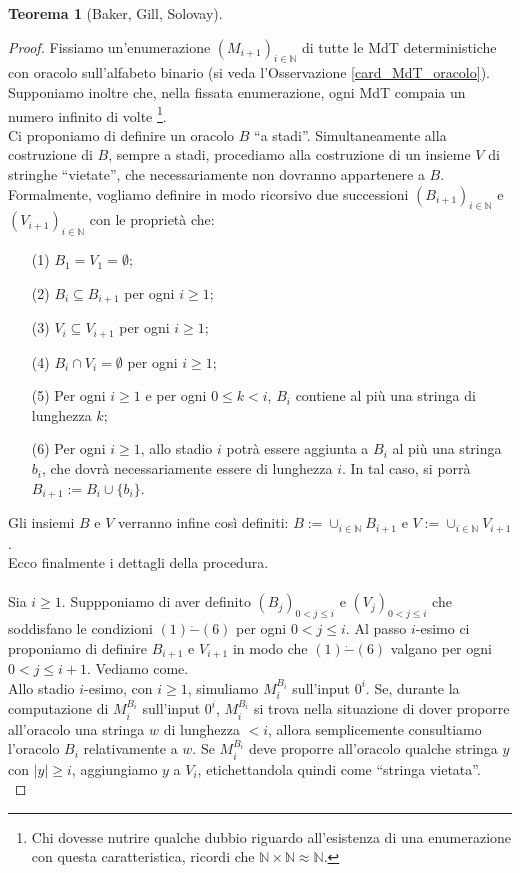 \documentclass[12pt,a4paper]{report}
\theoremstyle{definition}
\newtheorem{teo}{Teorema}[section]  %
\begin{document}
\begin{teo}[Baker, Gill, Solovay]
\begin{proof}
Fissiamo un'enumerazione $(M_{i+1})_{i \in \mathbb{N}}$ di tutte le MdT deterministiche con oracolo sull'alfabeto binario (si veda l'Osservazione \ref{card_MdT_oracolo}). Supponiamo inoltre che, nella fissata enumerazione, ogni MdT compaia un numero infinito di volte \footnote{Chi dovesse nutrire qualche dubbio riguardo all'esistenza di una enumerazione con questa caratteristica, ricordi che $\mathbb{N} \times \mathbb{N} \approx \mathbb{N}$.}.\\
Ci proponiamo di definire un oracolo $B$ ``a stadi''. Simultaneamente alla costruzione di $B$, sempre a stadi, procediamo alla costruzione di un insieme $V$ di stringhe ``vietate'', che necessariamente non dovranno appartenere a $B$.\\
Formalmente, vogliamo definire in modo ricorsivo due successioni $(B_{i+1})_{i \in \mathbb{N}}$ e $(V_{i+1})_{i \in \mathbb{N}}$ con le proprietà che:
\begin{enumerate}
\item[(1)] $B_1=V_1=\emptyset$;
\item[(2)] $B_i \subseteq B_{i+1}$ per ogni $i \geq 1$;
\item[(3)] $V_i \subseteq V_{i+1}$ per ogni $i \geq 1$;
\item[(4)] $B_i \cap V_i = \emptyset$ per ogni $i \geq 1$;
\item[(5)] Per ogni $i \geq 1$ e per ogni $0 \leq k < i$, $B_i$ contiene al più una stringa di lunghezza $k$;
\item[(6)] Per ogni $i \geq 1$, allo stadio $i$ potrà essere aggiunta a $B_i$ al più una stringa $b_i$, che dovrà necessariamente essere di lunghezza $i$. In tal caso, si porrà $B_{i+1}:=B_i \cup \{b_i\}$.
\end{enumerate}
Gli insiemi $B$ e $V$ verranno infine così definiti: $B:=\cup_{i \in \mathbb{N}} B_{i+1}$ e $V:=\cup_{i \in \mathbb{N}} V_{i+1}$.\\
\noindent Ecco finalmente i dettagli della procedura.\\
\\
Sia $i \geq 1$. Suppponiamo di aver definito $(B_j)_{0<j \leq i}$ e $(V_j)_{0<j \leq i}$ che soddisfano le condizioni $(1)\dot{-}(6)$ per ogni $0<j \leq i$. Al passo $i$-esimo ci proponiamo di definire $B_{i+1}$ e $V_{i+1}$ in modo che $(1)\dot{-}(6)$ valgano per ogni $0<j \leq i+1$. Vediamo come.\\
Allo stadio $i$-esimo, con $i \geq 1$, simuliamo $M_i^{B_i}$ sull'input $0^i$. Se, durante la computazione di $M_i^{B_i}$ sull'input $0^i$, $M_i^{B_i}$ si trova nella situazione di dover proporre all'oracolo una stringa $w$ di lunghezza $<i$, allora semplicemente consultiamo l'oracolo $B_i$ relativamente a $w$. Se $M_i^{B_i}$ deve proporre all'oracolo qualche stringa $y$ con $|y| \geq i$, aggiungiamo $y$ a $V_i$, etichettandola quindi come ``stringa vietata''.\\

\end{proof}
\end{teo}
\end{document}
